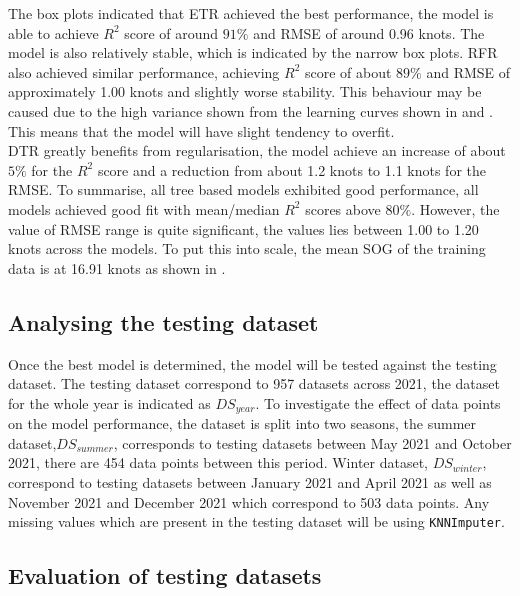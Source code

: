 The box plots indicated that ETR achieved the best performance, the model is able to achieve $R^2$ score of around $91\%$ and RMSE of around 0.96 knots. The model is also relatively stable, which is indicated by the narrow box plots. RFR also achieved similar performance, achieving $R^2$ score of about $89\%$ and RMSE of approximately 1.00 knots and slightly worse stability. This behaviour may be caused due to the high variance shown from the learning curves shown in  and . This means that the model will have slight tendency to overfit.\\

DTR greatly benefits from regularisation, the model achieve an increase of about $5\%$ for the $R^2$ score and a reduction from about 1.2 knots to 1.1 knots for the RMSE. To summarise, all tree based models exhibited good performance, all models achieved good fit with mean/median $R^2$ scores above $80\%$. However, the value of RMSE range is quite significant, the values lies between 1.00 to 1.20 knots across the models. To put this into scale, the mean SOG of the training data is at 16.91 knots as shown in .\\  

\subsection*{Analysing the testing dataset}

Once the best model is determined, the model will be tested against the testing dataset. The testing dataset correspond to 957 datasets across 2021, the dataset for the whole year is indicated as $DS_{year}$. To investigate the effect of data points on the model performance, the dataset is split into two seasons, the summer dataset,$DS_{summer}$, corresponds to testing datasets between May 2021 and October 2021, there are 454 data points between this period. Winter dataset, $DS_{winter}$, correspond to testing datasets between January 2021 and April 2021 as well as November 2021 and December 2021 which correspond to 503 data points. Any missing values which are present in the testing dataset will be using {\tt KNNImputer}.\\

\subsection*{Evaluation of testing datasets}

